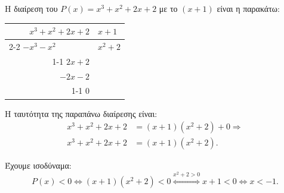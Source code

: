\begin{alist}
\item
\begin{rlist}
\item Η διαίρεση του $P(x) = x^3 + x^2 + 2x + 2$ με το $(x+1)$ είναι η παρακάτω:
\begin{center}
\begin{tabular}{r|l}
$x^3 + x^2 + 2x + 2$ & $x + 1$ \\ \cline{2-2}
$-x^3 - x^2 \phantom{{} + 2x + 2}$ & $x^2 + 2$ \\ \cline{1-1}
$2x + 2$ & \\
$-2x - 2$ & \\ \cline{1-1}
$0$ &
\end{tabular}
\end{center}
\item Η ταυτότητα της παραπάνω διαίρεσης είναι:
\begin{align*}
x^3 + x^2 + 2x + 2 &= (x + 1)(x^2 + 2) + 0 \Rightarrow \\
x^3 + x^2 + 2x + 2 &= (x + 1)(x^2 + 2).
\end{align*}
\end{rlist}
\item Έχουμε ισοδύναμα: 
\[P(x) < 0 \Leftrightarrow (x+1)(x^2 + 2) < 0 \overset{x^2+2>0}{\Leftrightarrow} x + 1 < 0 \Leftrightarrow x < -1.\]
\end{alist}

